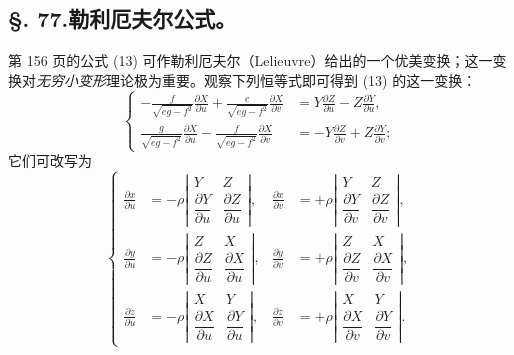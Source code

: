 \subsection*{\S. 77.\quad 勒利厄夫尔公式。}

第 156 页的公式 (13) 可作勒利厄夫尔（Lelieuvre）给出的一个优美变换；这一变换对\emph{无穷小变形}理论极为重要。观察下列恒等式即可得到 (13) 的这一变换：
\[
\left\{
\begin{aligned}
-\frac{f}{\sqrt{eg-f^2}}\frac{\partial X}{\partial u}+\frac{e}{\sqrt{eg-f^2}}\frac{\partial X}{\partial v}
&=Y\frac{\partial Z}{\partial u}-Z\frac{\partial Y}{\partial u},\\
\frac{g}{\sqrt{eg-f^2}}\frac{\partial X}{\partial u}-\frac{f}{\sqrt{eg-f^2}}\frac{\partial X}{\partial v}
&=-Y\frac{\partial Z}{\partial v}+Z\frac{\partial Y}{\partial v};
\end{aligned}\right.
\]
它们可改写为
\[
\left\{
\begin{aligned}
\frac{\partial x}{\partial u}&=-\rho\left|\begin{matrix}Y&Z\\[0.25em] \dfrac{\partial Y}{\partial u}&\dfrac{\partial Z}{\partial u}\end{matrix}\right|,
&
\frac{\partial x}{\partial v}&=+\rho\left|\begin{matrix}Y&Z\\[0.25em] \dfrac{\partial Y}{\partial v}&\dfrac{\partial Z}{\partial v}\end{matrix}\right|,\\[0.9em]
\frac{\partial y}{\partial u}&=-\rho\left|\begin{matrix}Z&X\\[0.25em] \dfrac{\partial Z}{\partial u}&\dfrac{\partial X}{\partial u}\end{matrix}\right|,
&
\frac{\partial y}{\partial v}&=+\rho\left|\begin{matrix}Z&X\\[0.25em] \dfrac{\partial Z}{\partial v}&\dfrac{\partial X}{\partial v}\end{matrix}\right|,\\[0.9em]
\frac{\partial z}{\partial u}&=-\rho\left|\begin{matrix}X&Y\\[0.25em] \dfrac{\partial X}{\partial u}&\dfrac{\partial Y}{\partial u}\end{matrix}\right|,
&
\frac{\partial z}{\partial v}&=+\rho\left|\begin{matrix}X&Y\\[0.25em] \dfrac{\partial X}{\partial v}&\dfrac{\partial Y}{\partial v}\end{matrix}\right|.
\end{aligned}\right.
\]
